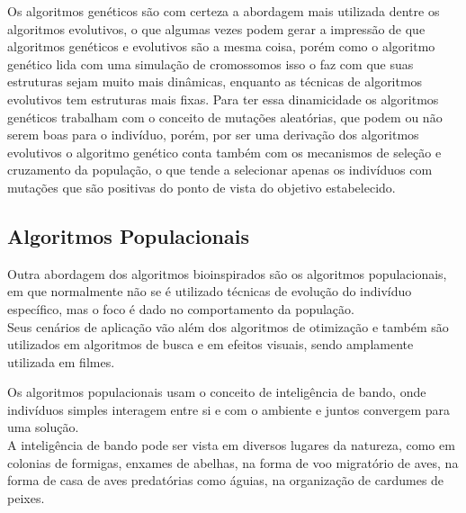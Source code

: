         Os algoritmos genéticos são com certeza a abordagem mais utilizada dentre os algoritmos evolutivos, o que algumas vezes podem gerar a impressão de que algoritmos genéticos e evolutivos são a mesma coisa, porém como o algoritmo genético lida com uma simulação de cromossomos isso o faz com que suas estruturas sejam muito mais dinâmicas, enquanto as técnicas de algoritmos evolutivos tem estruturas mais fixas.\newline
        Para ter essa dinamicidade os algoritmos genéticos trabalham com o conceito de mutações aleatórias, que podem ou não serem boas para o indivíduo, porém, por ser uma derivação dos algoritmos evolutivos o algoritmo genético conta também com os mecanismos de seleção e cruzamento da população, o que tende a selecionar apenas os indivíduos com mutações que são positivas do ponto de vista do objetivo estabelecido.


    \subsection{Algoritmos Populacionais}
        Outra abordagem dos algoritmos bioinspirados são os algoritmos populacionais, em que normalmente não se é utilizado técnicas de evolução do indivíduo específico, mas o foco é dado no comportamento da população.\hfill
        \\
        Seus cenários de aplicação vão além dos algoritmos de otimização e também são utilizados em algoritmos de busca e em efeitos visuais, sendo amplamente utilizada em filmes.\hfill\vspace{\onelineskip}
        
        Os algoritmos populacionais usam o conceito de inteligência de bando, onde indivíduos simples interagem entre si e com o ambiente e juntos convergem para uma solução.\hfill
        \\
        A inteligência de bando pode ser vista em diversos lugares da natureza, como em colonias de formigas, enxames de abelhas, na forma de voo migratório de aves, na forma de casa de aves predatórias como águias, na organização de cardumes de peixes.\hfill\vspace{\onelineskip}

